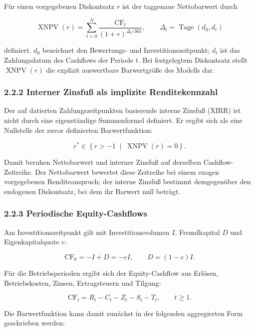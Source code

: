 \documentclass[
  a4paper,
  10pt]{article}
\begin{document}
Für einen vorgegebenen Diskontsatz \(r\) ist der taggenaue Nettobarwert
durch

\[
\operatorname{XNPV}(r)
  = \sum_{t=0}^{N}
    \frac{\mathrm{CF}_t}
         {(1+r)^{\Delta_t/365}},
\qquad
\Delta_t = \operatorname{Tage}(d_0,d_t)
\]

definiert. \(d_0\) bezeichnet den Bewertungs- und Investitionszeitpunkt;
\(d_t\) ist das Zahlungsdatum des Cashflows der Periode \(t\). Bei
festgelegtem Diskontsatz stellt \(\operatorname{XNPV}(r)\) die explizit
auswertbare Barwertgröße des Modells dar.

\hypertarget{interner-zinsfuuxdf-als-implizite-renditekennzahl}{%
\subsubsection{2.2.2 Interner Zinsfuß als implizite
Renditekennzahl}\label{interner-zinsfuuxdf-als-implizite-renditekennzahl}}

Der auf datierten Zahlungszeitpunkten basierende interne Zinsfuß (XIRR)
ist nicht durch eine eigenständige Summenformel definiert. Er ergibt
sich als eine Nullstelle der zuvor definierten Barwertfunktion:

\[
r^{*} \in
\left\{r>-1\;\middle|\;\operatorname{XNPV}(r)=0\right\}.
\]

Damit beruhen Nettobarwert und interner Zinsfuß auf derselben
Cashflow-Zeitreihe. Der Nettobarwert bewertet diese Zeitreihe bei einem
exogen vorgegebenen Renditeanspruch; der interne Zinsfuß bestimmt
demgegenüber den endogenen Diskontsatz, bei dem ihr Barwert null
beträgt.

\hypertarget{periodische-equity-cashflows}{%
\subsubsection{2.2.3 Periodische
Equity-Cashflows}\label{periodische-equity-cashflows}}

Am Investitionszeitpunkt gilt mit Investitionsvolumen \(I\),
Fremdkapital \(D\) und Eigenkapitalquote \(e\):

\[
\mathrm{CF}_0 = -I + D = -eI,
\qquad
D=(1-e)I.
\]

Für die Betriebsperioden ergibt sich der Equity-Cashflow aus Erlösen,
Betriebskosten, Zinsen, Ertragsteuern und Tilgung:

\[
\mathrm{CF}_t
  = R_t-C_t-Z_t-S_t-T_t,
\qquad t\geq 1.
\]

Die Barwertfunktion kann damit zunächst in der folgenden aggregierten
Form geschrieben werden:
\end{document}
